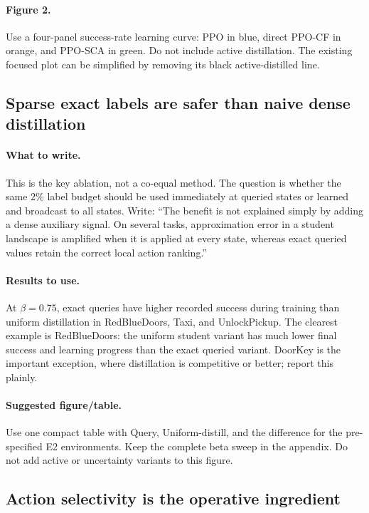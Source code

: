 \documentclass[11pt]{article}
\newcommand{\ppocf}{\textsc{PPO-CF}}
\newcommand{\pposca}{\textsc{PPO-SCA}}
\begin{document}
\paragraph{Figure 2.}
Use a four-panel success-rate learning curve: PPO in blue, direct \ppocf{} in
orange, and \pposca{} in green. Do not include active distillation. The existing
focused plot can be simplified by removing its black active-distilled line.

\subsection{Sparse exact labels are safer than naive dense distillation}

\paragraph{What to write.}
This is the key ablation, not a co-equal method. The question is whether the
same 2\% label budget should be used immediately at queried states or learned
and broadcast to all states. Write: ``The benefit is not explained simply by
adding a dense auxiliary signal. On several tasks, approximation error in a
student landscape is amplified when it is applied at every state, whereas exact
queried values retain the correct local action ranking.''

\paragraph{Results to use.}
At $\beta=0.75$, exact queries have higher recorded success during training than
uniform distillation in RedBlueDoors, Taxi, and UnlockPickup. The clearest
example is RedBlueDoors: the uniform student variant has much lower final
success and learning progress than the exact queried variant. DoorKey is the
important exception, where distillation is competitive or better; report this
plainly.

\paragraph{Suggested figure/table.}
Use one compact table with Query, Uniform-distill, and the difference for the
pre-specified E2 environments. Keep the complete beta sweep in the appendix.
Do not add active or uncertainty variants to this figure.

\subsection{Action selectivity is the operative ingredient}
\end{document}
